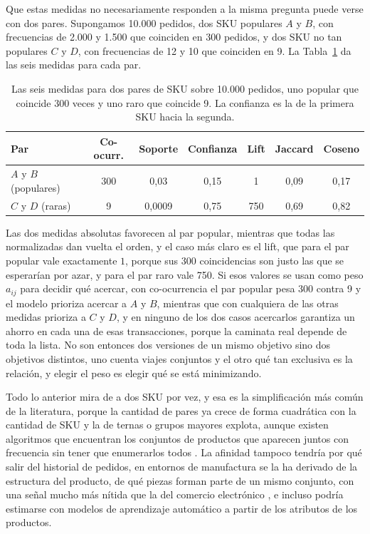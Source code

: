 Que estas medidas no necesariamente responden a la misma pregunta puede verse con dos pares.
Supongamos 10.000 pedidos, dos SKU populares $A$ y $B$, con frecuencias de 2.000 y 1.500 que coinciden en 300 pedidos, y dos SKU no tan populares $C$ y $D$, con frecuencias de 12 y 10 que coinciden en 9.
La Tabla~\ref{tab:ejemplo-afinidad} da las seis medidas para cada par.

\begin{table}[ht]
    \centering
    \footnotesize
    \setlength{\tabcolsep}{4pt}
    \begin{tabular}{|l|c|c|c|c|c|c|}
        \hline
        \textbf{Par} & \textbf{Co-ocurr.} & \textbf{Soporte} & \textbf{Confianza} & \textbf{Lift} & \textbf{Jaccard} & \textbf{Coseno} \\
        \hline
        $A$ y $B$ (populares) & 300 & 0,03 & 0,15 & 1 & 0,09 & 0,17 \\
        \hline
        $C$ y $D$ (raras) & 9 & 0,0009 & 0,75 & 750 & 0,69 & 0,82 \\
        \hline
    \end{tabular}
    \caption{Las seis medidas para dos pares de SKU sobre 10.000 pedidos, uno popular que coincide 300 veces y uno raro que coincide 9. La confianza es la de la primera SKU hacia la segunda.}
    \label{tab:ejemplo-afinidad}
\end{table}

Las dos medidas absolutas favorecen al par popular, mientras que todas las normalizadas dan vuelta el orden, y el caso más claro es el lift, que para el par popular vale exactamente $1$, porque sus 300 coincidencias son justo las que se esperarían por azar, y para el par raro vale 750.
Si esos valores se usan como peso $a_{ij}$ para decidir qué acercar, con co-ocurrencia el par popular pesa 300 contra 9 y el modelo prioriza acercar a $A$ y $B$, mientras que con cualquiera de las otras medidas prioriza a $C$ y $D$, y en ninguno de los dos casos acercarlos garantiza un ahorro en cada una de esas transacciones, porque la caminata real depende de toda la lista.
No son entonces dos versiones de un mismo objetivo sino dos objetivos distintos, uno cuenta viajes conjuntos y el otro qué tan exclusiva es la relación, y elegir el peso es elegir qué se está minimizando.

Todo lo anterior mira de a dos SKU por vez, y esa es la simplificación más común de la literatura, porque la cantidad de pares ya crece de forma cuadrática con la cantidad de SKU y la de ternas o grupos mayores explota, aunque existen algoritmos que encuentran los conjuntos de productos que aparecen juntos con frecuencia sin tener que enumerarlos todos \citep{han2004mining}.
La afinidad tampoco tendría por qué salir del historial de pedidos, en entornos de manufactura se la ha derivado de la estructura del producto, de qué piezas forman parte de un mismo conjunto, con una señal mucho más nítida que la del comercio electrónico \citep{brynzer1996storage}, e incluso podría estimarse con modelos de aprendizaje automático a partir de los atributos de los productos.

